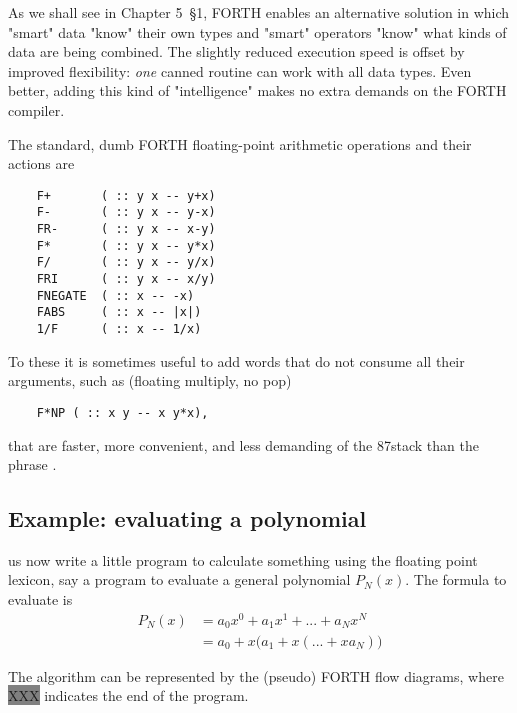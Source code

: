 As we shall see in Chapter 5~\S1, FORTH enables an alternative solution in which "smart" data "know" their own types and "smart" operators "know" what kinds of data are being combined. The slightly reduced execution speed is offset by improved flexibility: \textit{one} canned routine can work with all data types. Even better, adding this kind of "intelligence" makes no extra demands on the FORTH compiler.

The standard, dumb FORTH floating-point arithmetic operations and their actions are

\begin{lstlisting}
    F+       ( :: y x -- y+x)
    F-       ( :: y x -- y-x)
    FR-      ( :: y x -- x-y)
    F*       ( :: y x -- y*x)
    F/       ( :: y x -- y/x)
    FRI      ( :: y x -- x/y)
    FNEGATE  ( :: x -- -x)
    FABS     ( :: x -- |x|)
    1/F      ( :: x -- 1/x)
\end{lstlisting}

To these it is sometimes useful to add words that do not consume all their arguments, such as  (floating multiply, no pop)

\begin{lstlisting}
    F*NP ( :: x y -- x y*x),
\end{lstlisting}

that are faster, more convenient, and less demanding of the 87stack than the phrase .

\subsection{Example: evaluating a polynomial}
us now write a little program to calculate something using the floating point lexicon, say a program to evaluate a general polynomial $P_N (x)$. The formula to evaluate is
\begin{align}
    P_N(x)&=a_0x^0+a_1x^1+...+a_Nx^N \nonumber \\
    &=a_0+x\big(a_1+x(... +xa_N)\big)\nonumber
\end{align}


The algorithm can be represented by the (pseudo) FORTH flow diagrams, where {\colorbox{gray}{\color{gray}XXX}} indicates the end of the program.

